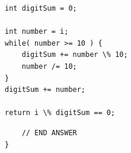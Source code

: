 \documentclass[11pt,answers]{exam}
\begin{document}
\begin{questions}
\begin{solution}[5in]
\begin{lstlisting}
int digitSum = 0;
	
int number = i;
while( number >= 10 ) {
    digitSum += number \% 10;
    number /= 10;
}
digitSum += number;
	
return i \% digitSum == 0;	
\end{lstlisting}
\end{solution}

\begin{verbatim}
    // END ANSWER
}	
\end{verbatim}

\end{questions}
\end{document}
